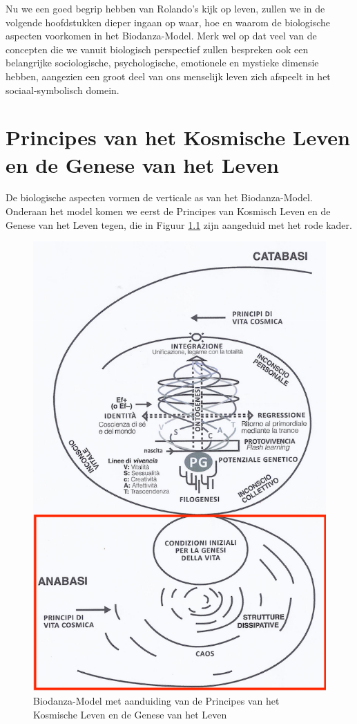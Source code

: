 \documentclass[
  11pt,
]{book}
\begin{document}
Nu we een goed begrip hebben van Rolando's kijk op leven, zullen we in de volgende hoofdstukken dieper ingaan op waar, hoe en waarom de biologische aspecten voorkomen in het Biodanza-Model. Merk wel op dat veel van de concepten die we vanuit biologisch perspectief zullen bespreken ook een belangrijke sociologische, psychologische, emotionele en mystieke dimensie hebben, aangezien een groot deel van ons menselijk leven zich afspeelt in het sociaal-symbolisch domein.

\hypertarget{principes-van-het-kosmische-leven-en-de-genese-van-het-leven}{%
\chapter{Principes van het Kosmische Leven en de Genese van het Leven}\label{principes-van-het-kosmische-leven-en-de-genese-van-het-leven}}

De biologische aspecten vormen de verticale as van het Biodanza-Model. Onderaan het model komen we eerst de Principes van Kosmisch Leven en de Genese van het Leven tegen, die in Figuur \ref{fig:modelCosmic} zijn aangeduid met het rode kader.

\begin{figure}

{\centering \includegraphics[width=0.5\linewidth]{./figs/biologischeAspectenBiodanzaDeelI} 

}

\caption{Biodanza-Model met aanduiding van de Principes van het Kosmische Leven en de Genese van het Leven}\label{fig:modelCosmic}
\end{figure}
\end{document}
